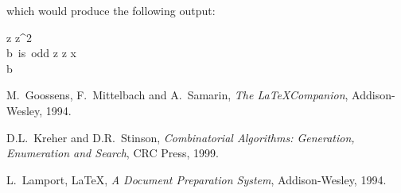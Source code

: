 \documentclass{article}
\begin{document}
\noindent which would produce the following output:

\begin{center}
\begin{minipage}{2in}
\begin{pseudocode}[display]{}{}
  z \GETS z^2  \\
  \IF b\mbox{ is odd}
    \THEN z \GETS z \cdot x  \\
     b \GETS {}
\end{pseudocode}
\end{minipage}
\end{center}

\begin{thebibliography}{99}

M.\ Goossens, F.\ Mittelbach and A.\ Samarin, {\it The \LaTeX Companion}, 
Addison-Wesley, 1994.

D.L.\ Kreher and D.R.\ Stinson,
{\em Combinatorial Algorithms: Generation, Enumeration and Search},
CRC Press, 1999.

L.\ Lamport, \LaTeX, 
{\em A Document Preparation System},
Addison-Wesley, 1994.
\end{thebibliography}
\end{document}
